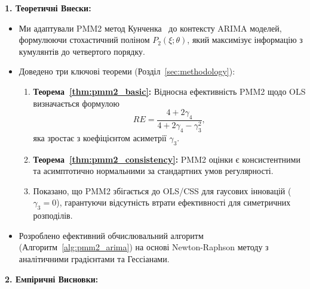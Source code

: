 \documentclass[12pt,a4paper]{article}
\begin{document}
\textbf{1. Теоретичні Внески:}

\begin{itemize}
    \item Ми адаптували PMM2 метод Кунченка~\cite{kunchenko2002polynomial} до контексту ARIMA моделей, формулюючи стохастичний поліном $P_2(\xi; \theta)$, який максимізує інформацію з кумулянтів до четвертого порядку.

    \item Доведено три ключові теореми (Розділ~\ref{sec:methodology}):
    \begin{enumerate}
        \item \textbf{Теорема~\ref{thm:pmm2_basic}:} Відносна ефективність PMM2 щодо OLS визначається формулою
        \begin{equation*}
            RE = \frac{4 + 2\gamma_4}{4 + 2\gamma_4 - \gamma_3^2},
        \end{equation*}
        яка зростає з коефіцієнтом асиметрії $\gamma_3$.

        \item \textbf{Теорема~\ref{thm:pmm2_consistency}:} PMM2 оцінки є консистентними та асимптотично нормальними за стандартних умов регулярності.

        \item Показано, що PMM2 збігається до OLS/CSS для гаусових інновацій ($\gamma_3 = 0$), гарантуючи відсутність втрати ефективності для симетричних розподілів.
    \end{enumerate}

    \item Розроблено ефективний обчислювальний алгоритм (Алгоритм~\ref{alg:pmm2_arima}) на основі Newton-Raphson методу з аналітичними градієнтами та Гессіанами.
\end{itemize}

\textbf{2. Емпіричні Висновки:}
\end{document}

